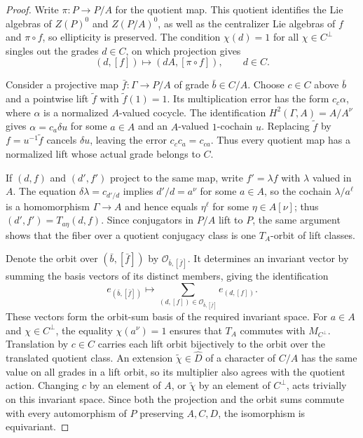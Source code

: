 \documentclass[11pt,a4paper,reqno]{amsart}
\theoremstyle{plain}
\theoremstyle{definition}
\theoremstyle{remark}
\numberwithin{equation}{section}
\newcommand{\cO}{\mathcal O}
\begin{document}
\begin{proof}
Write $\pi\colon P\to P/A$ for the quotient map. This quotient identifies the Lie algebras of $Z(P)^0$ and $Z(P/A)^0$, as well as the centralizer Lie algebras of $f$ and $\pi\circ f$, so ellipticity is preserved. The condition $\chi(d)=1$ for all $\chi\in C^\perp$ singles out the grades $d\in C$, on which projection gives
\[
(d,[f])\longmapsto(dA,[\pi\circ f]),\qquad d\in C.
\]

Consider a projective map $\bar f\colon\Gamma\to P/A$ of grade $\bar b\in C/A$. Choose $c\in C$ above $\bar b$ and a pointwise lift $\widetilde f$ with $\widetilde f(1)=1$. Its multiplication error has the form $c_c\alpha$, where $\alpha$ is a normalized $A$-valued cocycle. The identification $H^2(\Gamma,A)=A/A^\nu$ gives $\alpha=c_a\delta u$ for some $a\in A$ and an $A$-valued $1$-cochain $u$. Replacing $\widetilde f$ by $f=u^{-1}\widetilde f$ cancels $\delta u$, leaving the error $c_cc_a=c_{ca}$. Thus every quotient map has a normalized lift whose actual grade belongs to $C$.

If $(d,f)$ and $(d',f')$ project to the same map, write $f'=\lambda f$ with $\lambda$ valued in $A$. The equation $\delta\lambda=c_{d'/d}$ implies $d'/d=a^\nu$ for some $a\in A$, so the cochain $\lambda/a^\ell$ is a homomorphism $\Gamma\to A$ and hence equals $\eta^\ell$ for some $\eta\in A[\nu]$; thus $(d',f')=T_{a\eta}(d,f)$. Since conjugators in $P/A$ lift to $P$, the same argument shows that the fiber over a quotient conjugacy class is one $T_A$-orbit of lift classes.

Denote the orbit over $(\bar b,[\bar f])$ by $\cO_{\bar b,[\bar f]}$. It determines an invariant vector by summing the basis vectors of its distinct members, giving the identification
\[
e_{(\bar b,[\bar f])}\longmapsto
\sum_{(d,[f])\in\cO_{\bar b,[\bar f]}}e_{(d,[f])}.
\]
These vectors form the orbit-sum basis of the required invariant space. For $a\in A$ and $\chi\in C^\perp$, the equality $\chi(a^\nu)=1$ ensures that $T_A$ commutes with $M_{C^\perp}$. Translation by $c\in C$ carries each lift orbit bijectively to the orbit over the translated quotient class. An extension $\widetilde\chi\in\widehat D$ of a character of $C/A$ has the same value on all grades in a lift orbit, so its multiplier also agrees with the quotient action. Changing $c$ by an element of $A$, or $\widetilde\chi$ by an element of $C^\perp$, acts trivially on this invariant space. Since both the projection and the orbit sums commute with every automorphism of $P$ preserving $A,C,D$, the isomorphism is equivariant.


\end{proof}
\end{document}
